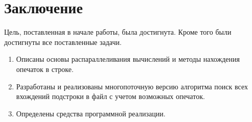 \chapter*{Заключение}

Цель, поставленная в начале работы, была достигнута.
Кроме того были достигнуты все поставленные задачи.
\begin{enumerate}
	\item Описаны основы распараллеливания вычислений и методы нахождения опечаток в строке.
	\item Разработаны и реализованы многопоточную версию алгоритма поиск всех вхождений подстроки в файл с учетом возможных опечаток.
	\item Определены средства программной реализации.
\end{enumerate}
